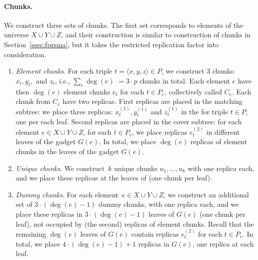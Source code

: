 \paragraph{Chunks.}
We construct three sets of chunks.
The first set corresponds to elements of the universe $X\cup Y\cup Z$, and their construction is similar to construction of chunks in Section~\ref{ssec:fprsma}, but it takes the restricted replication factor into consideration.
\begin{enumerate}
  \item \emph{Element chunks}. For each triple $t = \langle x, y, z \rangle \in P$, we construct $3$ chunks:~$x_t, y_t,$ and $z_t$, i.e., $\sum_e\deg(e)$ $=3\cdot p$ chunks in total.
  Each element $e$ have then $\deg(e)$ element chunks $e_t$ for each $t \in P_e$,  collectively called $C_e$.
  Each chunk from $C_e$ have two replicas. First replicas are placed in the matching subtree:
  we place
  three replicas: $x_t^{(1)}, y_t^{(1)}$ and $z_t^{(1)}$ in the {\TripleGadget} for triple $t\in P$, one per each leaf.
  Second replicas are placed in the cover subtree:
  for each element $e \in X\cup Y\cup Z$, for each $t \in P_e$,
  we place replicas $e_t^{(2)}$ in different leaves of the gadget $G(e)$.
  In total, we place $\deg(e)$ replicas of element chunks in the leaves of the gadget $G(e)$.
  \item \emph{Unique chunks}. We construct~$k$ unique chunks $u_1, \ldots, u_k$ with one replica each, and we place these replicas at the leaves of {\UnqGadgets} (one chunk per leaf).
  \item \emph{Dummy chunks}. For each element~$e\in X\cup Y\cup Z$,
  we construct an additional set of $3\cdot(\deg(e) - 1)$ dummy chunks, with one replica each, and we place these replicas in $3\cdot (\deg(e)-1)$ leaves of $G(e)$ (one chunk per leaf),
  not occupied by (the second) replicas of element chunks.
  Recall that the remaining $\deg(e)$ leaves of $G(e)$ contain replicas $e_t^{(2)}$ for each $t \in P_e$. In total, we place $4\cdot (\deg(e) - 1) + 1$ replicas in $G(e)$, one replica at each leaf.
\end{enumerate}

